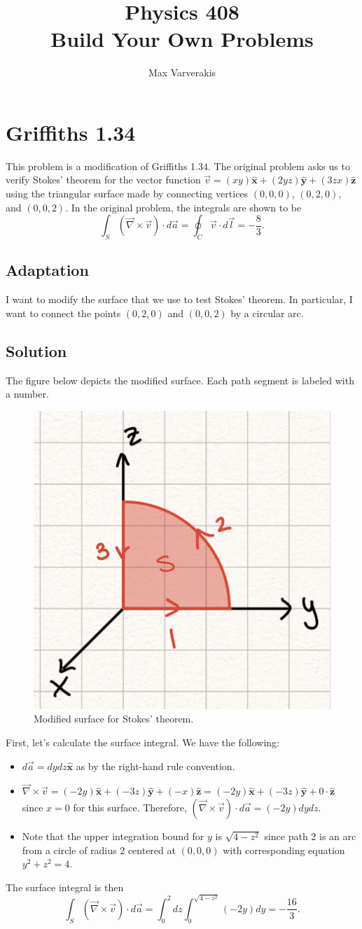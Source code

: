 \documentclass{article}
\title{Physics 408\\[0.5em]
	Build Your Own Problems\\
}
\author{Max Varverakis}
\newcommand{\xhat}{\hat{\textbf{x}}}
\newcommand{\yhat}{\hat{\textbf{y}}}
\newcommand{\zhat}{\hat{\textbf{z}}}
\newcommand{\del}{\vec{\nabla}}
\begin{document}
\maketitle

\section*{Griffiths 1.34}
This problem is a modification of Griffiths 1.34. The original problem asks us to verify Stokes' theorem for the vector function $\vec{v} = (xy)\xhat + (2yz)\yhat + (3zx)\zhat$ using the triangular surface made by connecting vertices $(0,0,0)$, $(0,2,0)$, and $(0,0,2)$. In the original problem, the integrals are shown to be
\begin{equation}
	\int_{S}(\del\times\vec{v})\cdot d\vec{a} = \oint_{C}\vec{v}\cdot d\vec{l} = -\frac{8}{3}.
\end{equation}

\subsection*{Adaptation}
I want to modify the surface that we use to test Stokes' theorem. In particular, I want to connect the points $(0,2,0)$ and $(0,0,2)$ by a circular arc.

\subsection*{Solution}
The figure below depicts the modified surface. Each path segment is labeled with a number.
\begin{figure}[htpb]
	\centering
	\includegraphics[width = .25\textwidth]{1.34.png}
\caption{Modified surface for Stokes' theorem.}
\end{figure}

First, let's calculate the surface integral. We have the following:
\begin{itemize}
	\item $d\vec{a} = dydz\xhat$ as by the right-hand rule convention.
	\item $\del\times\vec{v} = (-2y)\xhat + (-3z)\yhat + (-x)\zhat = (-2y)\xhat + (-3z)\yhat + 0\cdot\zhat$ since $x=0$ for this surface. Therefore, $(\del\times\vec{v})\cdot d\vec{a} = (-2y)dydz$.
	\item Note that the upper integration bound for $y$ is $\sqrt{4-z^2}$ since path 2 is an arc from a circle of radius $2$ centered at $(0,0,0)$ with corresponding equation $y^2 + z^2 = 4$.
\end{itemize}
The surface integral is then
\begin{equation}
	\int_S(\del\times\vec{v})\cdot d\vec{a} = \int_0^2dz\int_0^{\sqrt{4-z^2}}(-2y)dy = -\frac{16}{3}.
\end{equation}
\end{document}
